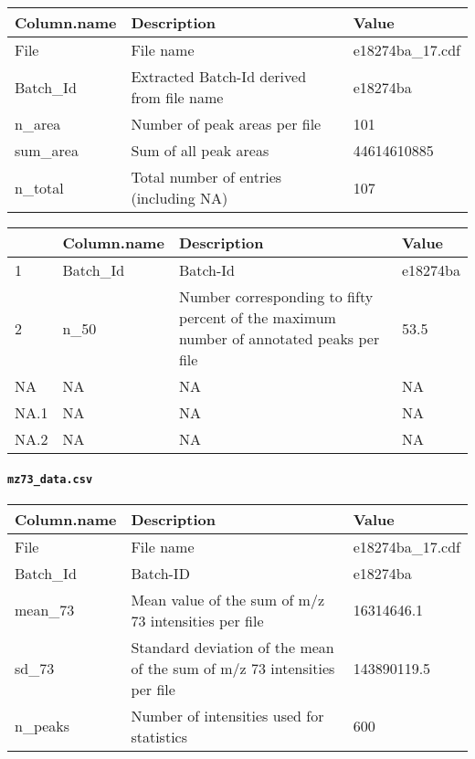 \documentclass[]{book}
\let\oldparagraph\paragraph
\renewcommand{\paragraph}[1]{\oldparagraph{#1}\mbox{}}
\begin{document}
\begin{tabu} to 
\toprule
Column.name & Description & Value\\
\midrule
{}  File & File name & e18274ba\_17.cdf\\
Batch\_Id & Extracted Batch-Id derived from file name & e18274ba\\
  n\_area & Number of peak areas per file & 101\\
sum\_area & Sum of all peak areas & 44614610885\\
  n\_total & Total number of entries (including NA) & 107\\
\bottomrule
\end{tabu}

\begin{tabu} to 
\toprule
  & Column.name & Description & Value\\
\midrule
{}  1 & Batch\_Id & Batch-Id & e18274ba\\
2 & n\_50 & Number corresponding to fifty percent of the maximum number of annotated peaks per file & 53.5\\
  NA & NA & NA & NA\\
NA.1 & NA & NA & NA\\
  NA.2 & NA & NA & NA\\
\bottomrule
\end{tabu}

\hypertarget{mz73_data.csv}{%
\paragraph{\texorpdfstring{\texttt{mz73\_data.csv}}{mz73\_data.csv}}\label{mz73_data.csv}}

\begin{tabu} to 
\toprule
Column.name & Description & Value\\
\midrule
{}  File & File name & e18274ba\_17.cdf\\
Batch\_Id & Batch-ID & e18274ba\\
  mean\_73 & Mean value of the sum of m/z 73 intensities per file & 16314646.1\\
sd\_73 & Standard deviation of the mean of the sum of m/z 73 intensities per file & 143890119.5\\
  n\_peaks & Number of intensities used for statistics & 600\\
\bottomrule
\end{tabu}
\end{document}
